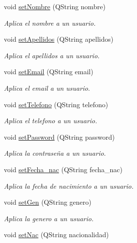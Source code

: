 \begin{DoxyCompactItemize}
void \mbox{\hyperlink{classUser_ac8bd16ed398601492fc2550d64fa55a2}{set\+Nombre}} (Q\+String nombre)
\begin{DoxyCompactList}\small\item\em Aplica el nombre a un usuario. \end{DoxyCompactList}\item 
void \mbox{\hyperlink{classUser_a3bff682a17f1b65cfedd9a5e1bb2acde}{set\+Apellidos}} (Q\+String apellidos)
\begin{DoxyCompactList}\small\item\em Aplica el apellidos a un usuario. \end{DoxyCompactList}\item 
void \mbox{\hyperlink{classUser_aa027aa9e931621418c045c6680b9461f}{set\+Email}} (Q\+String email)
\begin{DoxyCompactList}\small\item\em Aplica el email a un usuario. \end{DoxyCompactList}\item 
void \mbox{\hyperlink{classUser_a9fbcdc88fdffe99a216fc35baa7825ae}{set\+Telefono}} (Q\+String telefono)
\begin{DoxyCompactList}\small\item\em Aplica el telefono a un usuario. \end{DoxyCompactList}\item 
void \mbox{\hyperlink{classUser_a2fa7106fd6d96c663e34ebe82526d5ee}{set\+Password}} (Q\+String password)
\begin{DoxyCompactList}\small\item\em Aplica la contraseña a un usuario. \end{DoxyCompactList}\item 
void \mbox{\hyperlink{classUser_a09f782800ba5217b98f0d20fc1010ca0}{set\+Fecha\+\_\+nac}} (Q\+String fecha\+\_\+nac)
\begin{DoxyCompactList}\small\item\em Aplica la fecha de nacimiento a un usuario. \end{DoxyCompactList}\item 
void \mbox{\hyperlink{classUser_a23659aed8f058b19a148449c77a5509e}{set\+Gen}} (Q\+String genero)
\begin{DoxyCompactList}\small\item\em Aplica la genero a un usuario. \end{DoxyCompactList}\item 
void \mbox{\hyperlink{classUser_ab3992a71bc607e8c919a7d9f941c9b4f}{set\+Nac}} (Q\+String nacionalidad)

\end{DoxyCompactItemize}

